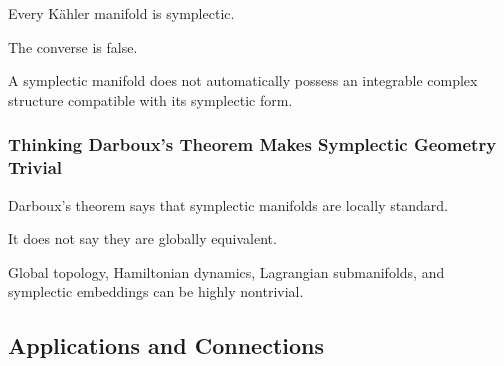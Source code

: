 Every K\"ahler manifold is symplectic.

The converse is false.

A symplectic manifold does not automatically possess an integrable complex
structure compatible with its symplectic form.

\subsubsection{Thinking Darboux's Theorem Makes Symplectic Geometry Trivial}

Darboux's theorem says that symplectic manifolds are locally standard.

It does not say they are globally equivalent.

Global topology, Hamiltonian dynamics, Lagrangian submanifolds, and
symplectic embeddings can be highly nontrivial.

\subsection{Applications and Connections}
\label{subsec:symplectic-applications}

